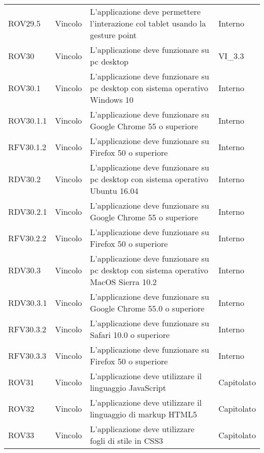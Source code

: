 \begin{longtable}{p{2cm}!{\VRule[1pt]}p{2cm}!{\VRule[1pt]}p{5cm}!{\VRule[1pt]}p{1.5cm}}
ROV29.5&Vincolo\newline  & L'applicazione deve permettere l'interazione col tablet usando la gesture point & Interno \\
ROV30&Vincolo\newline  & L’applicazione deve funzionare su pc desktop & VI_3.3 \\
ROV30.1&Vincolo\newline  & L’applicazione deve funzionare su pc desktop con sistema operativo Windows 10 & Interno \\
ROV30.1.1&Vincolo\newline  & L’applicazione deve funzionare su Google Chrome 55 o superiore & Interno \\
RFV30.1.2&Vincolo\newline  & L’applicazione deve funzionare su Firefox 50 o superiore & Interno \\
RDV30.2&Vincolo\newline  & L’applicazione deve funzionare su pc desktop con sistema operativo Ubuntu 16.04 & Interno \\
RDV30.2.1&Vincolo\newline  & L’applicazione deve funzionare su Google Chrome 55 o superiore & Interno \\
RFV30.2.2&Vincolo\newline  & L’applicazione deve funzionare su Firefox 50 o superiore & Interno \\
RDV30.3&Vincolo\newline  & L’applicazione deve funzionare su pc desktop con sistema operativo MacOS Sierra 10.2 & Interno \\
RDV30.3.1&Vincolo\newline  & L’applicazione deve funzionare su Google Chrome 55.0 o superiore & Interno \\
RFV30.3.2&Vincolo\newline  & L’applicazione deve funzionare su Safari 10.0 o superiore & Interno \\
RFV30.3.3&Vincolo\newline  & L’applicazione deve funzionare su Firefox 50 o superiore & Interno \\
ROV31&Vincolo\newline  & L’applicazione deve utilizzare il linguaggio JavaScript & Capitolato \\
ROV32&Vincolo\newline  & L’applicazione deve utilizzare il linguaggio di markup HTML5 & Capitolato \\
ROV33&Vincolo\newline  & L’applicazione deve utilizzare fogli di stile in CSS3 & Capitolato \\

\end{longtable}
